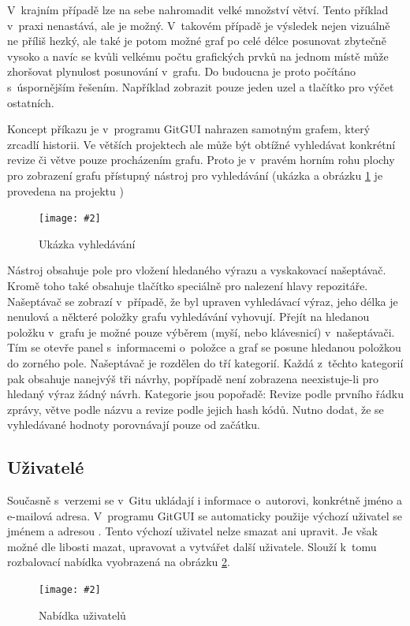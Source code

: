 \documentclass[
  biblatex,
  glossaries,
  index
]{kidiplom}
\newcommand{\pic}[4]{
\begin{figure}[h]
\centering
\texttt{[image: \#2]}
\caption{#3}
\label{fig:#4}
\end{figure}}
\begin{document}
V~krajním případě lze na sebe nahromadit velké množství větví. Tento příklad v~praxi nenastává, ale je možný. V~takovém případě je výsledek nejen vizuálně ne příliš hezký, ale také je potom možné graf po celé délce posunovat zbytečně vysoko a navíc se kvůli velkému počtu grafických prvků na jednom místě může zhoršovat plynulost posunování v~grafu. Do budoucna je proto počítáno s~úspornějším řešením. Například zobrazit pouze jeden uzel a tlačítko pro výčet ostatních.

Koncept příkazu  je v~programu GitGUI nahrazen samotným grafem, který zrcadlí historii. Ve větších projektech ale může být obtížné vyhledávat konkrétní revize či větve pouze procházením grafu. Proto je v~pravém horním rohu plochy pro zobrazení grafu přístupný nástroj pro vyhledávání (ukázka a obrázku \ref{fig:searchtool} je provedena na projektu \cite{libgitreference})

\pic{10cm}{searchbar.png}{Ukázka vyhledávání}{searchtool}

Nástroj obsahuje pole pro vložení hledaného výrazu a vyskakovací našeptávač. Kromě toho také obsahuje tlačítko speciálně pro nalezení hlavy repozitáře. Našeptávač se zobrazí v~případě, že byl upraven vyhledávací výraz, jeho délka je nenulová a některé položky grafu vyhledávání vyhovují. Přejít na hledanou položku v~grafu je možné pouze výběrem (myší, nebo klávesnicí) v~našeptávači. Tím se otevře panel s~informacemi o~položce a graf se posune hledanou položkou do zorného pole. Našeptávač je rozdělen do tří kategorií. Každá z~těchto kategorií pak obsahuje nanejvýš tři návrhy, popřípadě není zobrazena neexistuje-li pro hledaný výraz žádný návrh. Kategorie jsou popořadě: Revize podle prvního řádku zprávy, větve podle názvu a revize podle jejich hash kódů. Nutno dodat, že se vyhledávané hodnoty porovnávají pouze od začátku.

\subsection{Uživatelé}
Současně s~verzemi se v~Gitu ukládají i informace o~autorovi, konkrétně jméno a e-mailová adresa. V~programu GitGUI se automaticky použije výchozí uživatel se jménem  a adresou \uv{-}. Tento výchozí uživatel nelze smazat ani upravit. Je však možné dle libosti mazat, upravovat a vytvářet další uživatele. Slouží k~tomu rozbalovací nabídka vyobrazená na obrázku \ref{fig:users}.

\pic{10cm}{users.png}{Nabídka uživatelů}{users}
\end{document}
